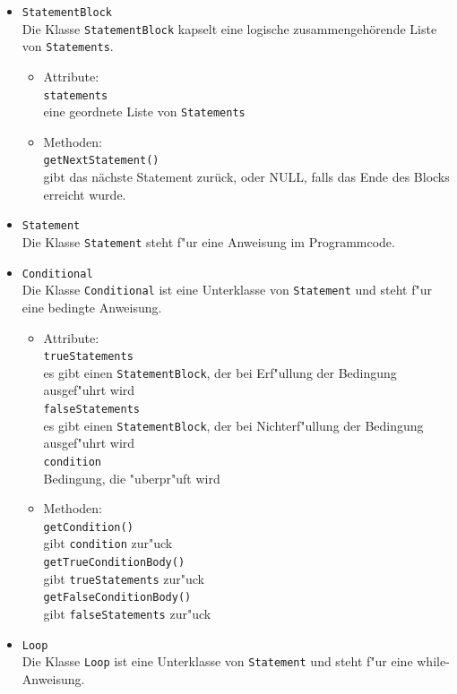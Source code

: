 \documentclass[10pt,a4paper,titlepage]{article}
\begin{document}
\begin{itemize}
\item \texttt{StatementBlock} \\
Die Klasse \texttt{StatementBlock} kapselt eine logische zusammengehörende Liste von \texttt{Statements}.
\begin{itemize}
\item Attribute: \\
\texttt{statements} \\
eine geordnete Liste von \texttt{Statements} \\
\item Methoden: \\
\texttt{getNextStatement()} \\
gibt das nächste Statement zurück, oder NULL, falls das Ende des Blocks erreicht wurde.
\end{itemize}
\item \texttt{Statement} \\
Die Klasse \texttt{Statement} steht f"ur eine Anweisung im Programmcode. 
\item \texttt{Conditional} \\
Die Klasse \texttt{Conditional} ist eine Unterklasse von \texttt{Statement} und steht f"ur eine bedingte Anweisung. 
\begin{itemize}
\item Attribute: \\
\texttt{trueStatements} \\
es gibt einen \texttt{StatementBlock}, der bei Erf"ullung der Bedingung ausgef"uhrt wird \\
\texttt{falseStatements} \\
es gibt einen \texttt{StatementBlock}, der bei Nichterf"ullung der Bedingung ausgef"uhrt wird \\
\texttt{condition} \\
Bedingung, die "uberpr"uft wird
\item Methoden: \\
\texttt{getCondition()} \\
gibt \texttt{condition} zur"uck \\
\texttt{getTrueConditionBody()} \\
gibt \texttt{trueStatements} zur"uck \\
\texttt{getFalseConditionBody()} \\
gibt \texttt{falseStatements} zur"uck
\end{itemize}
\item \texttt{Loop} \\
Die Klasse \texttt{Loop} ist eine Unterklasse von \texttt{Statement} und steht f"ur eine while-Anweisung. 

\end{itemize}
\end{document}
